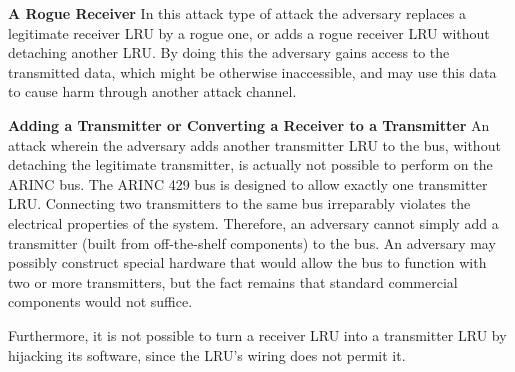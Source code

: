 \documentclass[english]{llncs}
\begin{document}

  \textbf{A Rogue Receiver}
  In this attack type of attack the adversary replaces a legitimate receiver LRU by a rogue one, or adds a rogue receiver LRU without detaching another LRU. By doing this the adversary gains access to the transmitted data, which might be otherwise inaccessible, and may use this data to cause harm through another attack channel.

  \textbf{Adding a Transmitter or Converting a Receiver to a Transmitter}
  An attack wherein the adversary adds another transmitter LRU to the bus, without detaching the legitimate transmitter, is actually not possible to perform on the ARINC bus. The ARINC 429 bus is designed to allow exactly one transmitter LRU. Connecting two transmitters to the same bus irreparably violates the electrical properties of the system. Therefore, an adversary cannot simply add a transmitter (built from off-the-shelf components) to the bus. 
  An adversary may possibly construct special hardware that would allow the bus to function with two or more transmitters, 
  but the fact remains that standard commercial components would not suffice.

  Furthermore, it is not possible to turn a receiver LRU into a transmitter LRU by hijacking its software, since the LRU's wiring does not permit it. 
 
\end{document}

